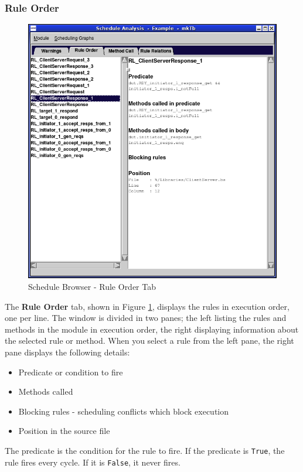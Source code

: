 \documentclass{article}
\newcommand{\te}[1]{\texttt{#1}}
\begin{document}
\subsubsection{Rule Order}
\begin{figure}[ht]
\begin{center}
\includegraphics[width = 3.5 in]{figures/schedule_ruleorder}
\caption{Schedule Browser - Rule Order Tab}
\label{fig-ruleorder}
\end{center}
\end{figure}

The {\bf Rule Order} tab, shown in Figure \ref{fig-ruleorder},
displays the rules in execution order, one per line.
The window is divided in two panes; the left listing the
rules and methods in the module in execution order, the right
displaying information about the selected rule or method.  When you
select a rule from the left pane, the right pane displays the
following details:


\begin{itemize}

\item Predicate or condition to fire

\item Methods called

\item Blocking rules - scheduling conflicts which block execution
\item Position in the source file


\end{itemize}

The predicate is the condition for the rule to fire.  If the predicate is \te{True}, the rule fires every cycle.  If it is
\te{False}, it never fires.
\end{document}
